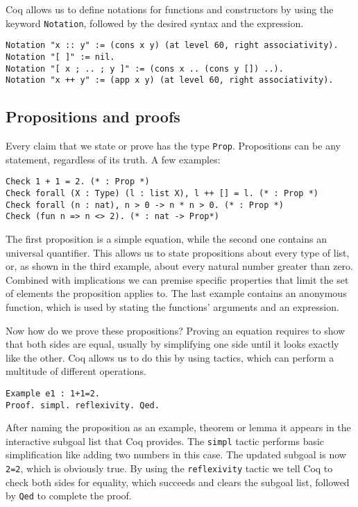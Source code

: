 \documentclass{scrreprt}
\newcommand{\todo}[1]{\marginpar{\textbf{TODO:} #1}}
\newcommand{\coqinline}[1]{\texttt{#1}}
\begin{document}
Coq allows us to define notations for functions and constructors by using the keyword \coqinline{Notation}, followed by the desired syntax and the expression. 
\begin{verbatim}
Notation "x :: y" := (cons x y) (at level 60, right associativity).
Notation "[ ]" := nil.
Notation "[ x ; .. ; y ]" := (cons x .. (cons y []) ..).
Notation "x ++ y" := (app x y) (at level 60, right associativity).
\end{verbatim}

\subsection{Propositions and proofs}
Every claim that we state or prove has the type \coqinline{Prop}. Propositions can be any statement, regardless of its truth. A few examples:
\begin{verbatim}
Check 1 + 1 = 2. (* : Prop *)
Check forall (X : Type) (l : list X), l ++ [] = l. (* : Prop *)
Check forall (n : nat), n > 0 -> n * n > 0. (* : Prop *)
Check (fun n => n <> 2). (* : nat -> Prop*)
\end{verbatim}
The first proposition is a simple equation, while the second one contains an universal quantifier. This allows us to state propositions about every type of list, or, as shown in the third example, about every natural number greater than zero. Combined with implications we can premise specific properties that limit the set of elements the proposition applies to. The last example contains an anonymous function, which is used by stating the functions' arguments and an expression.
\par
Now how do we prove these propositions? Proving an equation requires to show that both sides are equal, usually by simplifying one side until it looks exactly like the other. Coq allows us to do this by using tactics, which can perform a multitude of different operations.
\begin{verbatim}
Example e1 : 1+1=2.
Proof. simpl. reflexivity. Qed. 
\end{verbatim} 
\todo{Highlighting für Proof und Qed}
After naming the proposition as an example, theorem or lemma it appears in the interactive subgoal list that Coq provides. The \coqinline{simpl} tactic performs basic simplification like adding two numbers in this case. The updated subgoal is now \coqinline{2=2}, which is obviously true. By using the \coqinline{reflexivity} tactic we tell Coq to check both sides for equality, which succeeds and clears the subgoal list, followed by \coqinline{Qed} to complete the proof.
\end{document}
